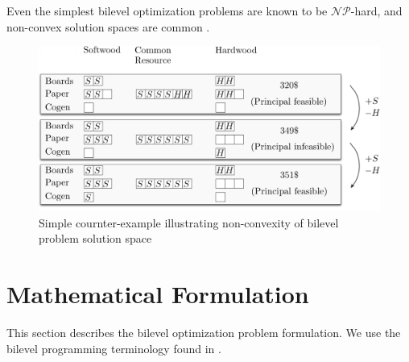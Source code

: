 Even the simplest bilevel optimization problems are known to be $\mathcal{NP}$-hard, and non-convex solution spaces are common \citep{dempe2003annotated, colson2007overview}. 



\begin{figure}[H]
  \centering
  \includegraphics[width=\textwidth]{images/counterexample_edited2}
  \caption{Simple cournter-example illustrating non-convexity of bilevel problem solution space}
  \label{fig:counterexample}
\end{figure}


%


\section{Mathematical Formulation}
\label{sec:formulation2}

This section describes the bilevel optimization problem formulation. We use the bilevel programming terminology found in \citet{colson2007overview}.

